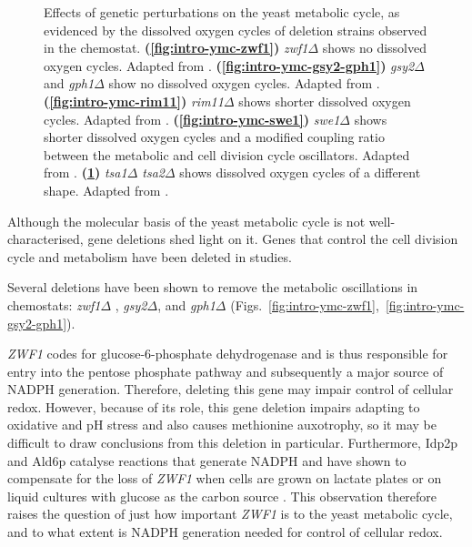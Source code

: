 \begin{figure}
\begin{subfigure}[htpb]{0.4\textwidth}
   \caption{
   }
   \label{fig:intro-ymc-tsa1-tsa2}
  \end{subfigure}
  \caption[
    Effects of genetic perturbations on the yeast metabolic cycle
  ]{
    Effects of genetic perturbations on the yeast metabolic cycle, as evidenced by the dissolved oxygen cycles of deletion strains observed in the chemostat.
    \textbf{(\ref{fig:intro-ymc-zwf1})}
    \textit{zwf1$\Delta$} shows no dissolved oxygen cycles.
    Adapted from \textcite{tuCyclicChangesMetabolic2007}.
    \textbf{(\ref{fig:intro-ymc-gsy2-gph1})}
    \textit{gsy2$\Delta$} and \textit{gph1$\Delta$} show no dissolved oxygen cycles.
    Adapted from \textcite{oneillEukaryoticCellBiology2020}.
    \textbf{(\ref{fig:intro-ymc-rim11})}
    \textit{rim11$\Delta$} shows shorter dissolved oxygen cycles.
    Adapted from \textcite{caustonMetabolicCyclesYeast2015}.
    \textbf{(\ref{fig:intro-ymc-swe1})}
    \textit{swe1$\Delta$} shows shorter dissolved oxygen cycles and a modified coupling ratio between the metabolic and cell division cycle oscillators.
    Adapted from \textcite{caustonMetabolicCyclesYeast2015}.
    \textbf{(\ref{fig:intro-ymc-tsa1-tsa2})}
    \textit{tsa1$\Delta$ tsa2$\Delta$} shows dissolved oxygen cycles of a different shape.
    Adapted from \textcite{caustonMetabolicCyclesYeast2015}.
  }
  \label{fig:intro-ymc-del}
\end{figure}

Although the molecular basis of the yeast metabolic cycle is not well-characterised, gene deletions shed light on it.
Genes that control the cell division cycle and metabolism have been deleted in studies.

Several deletions have been shown to remove the metabolic oscillations in chemostats: \textit{zwf1$\Delta$} \parencite{tuCyclicChangesMetabolic2007}, \textit{gsy2$\Delta$}, and \textit{gph1$\Delta$} \parencite{oneillEukaryoticCellBiology2020} (Figs.\ \ref{fig:intro-ymc-zwf1},~\ref{fig:intro-ymc-gsy2-gph1}).

\textit{ZWF1} codes for glucose-6-phosphate dehydrogenase and is thus responsible for entry into the pentose phosphate pathway and subsequently a major source of NADPH generation.
Therefore, deleting this gene may impair control of cellular redox.
However, because of its role, this gene deletion impairs adapting to oxidative and pH stress and also causes methionine auxotrophy, so it may be difficult to draw conclusions from this deletion in particular.
Furthermore, Idp2p and Ald6p catalyse reactions that generate NADPH and have shown to compensate for the loss of \textit{ZWF1} when cells are grown on lactate plates or on liquid cultures with glucose as the carbon source \parencite{minardSourcesNADPHYeast2005}.
This observation therefore raises the question of just how important \textit{ZWF1} is to the yeast metabolic cycle, and to what extent is NADPH generation needed for control of cellular redox.

